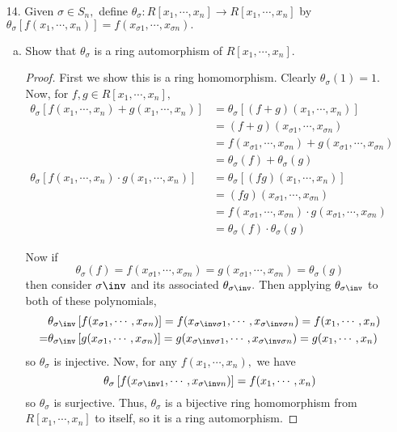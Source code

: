 \documentclass{article}
\begin{document}
\begin{itemize}
	\item[14.] Given $\sigma\in S_n,$ define $\theta_\sigma: R[x_1, \cdots, x_n]\to R[x_1, \cdots, x_n]$ by $\theta_\sigma\left[ f(x_1, \cdots, x_n) \right]=f(x_{\sigma 1}, \cdots, x_{\sigma n}).$
		\begin{enumerate}[(a)]
			\item Show that $\theta_\sigma$ is a ring automorphism of $R[x_1, \cdots, x_n].$
				\begin{proof}
					First we show this is a ring homomorphism. Clearly $\theta_\sigma(1)=1.$ Now, for $f, g\in R[x_1, \cdots, x_n],$
					\begin{align*}
						\theta_\sigma\left[f(x_1, \cdots, x_n)+g(x_1, \cdots, x_n)\right] &= \theta_\sigma\left[ (f+g)(x_1, \cdots, x_n) \right] \\
						&= (f+g)(x_{\sigma1}, \cdots, x_{\sigma n}) \\
						&= f(x_{\sigma1}, \cdots, x_{\sigma n}) + g(x_{\sigma1}, \cdots, x_{\sigma n}) \\
						&= \theta_\sigma(f) + \theta_\sigma(g) \\
						\theta_\sigma\left[f(x_1, \cdots, x_n)\cdot g(x_1, \cdots, x_n)\right] &= \theta_\sigma\left[ (fg)(x_1, \cdots, x_n) \right] \\
						&= (fg)(x_{\sigma1}, \cdots, x_{\sigma n}) \\
						&= f(x_{\sigma1}, \cdots, x_{\sigma n}) \cdot g(x_{\sigma 1}, \cdots, x_{\sigma n}) \\
						&= \theta_\sigma(f)\cdot \theta_\sigma(g)
					\end{align*}

					Now if 
					\[\theta_\sigma(f)=f(x_{\sigma1}, \cdots, x_{\sigma n}) = g(x_{\sigma 1}, \cdots, x_{\sigma n}) = \theta_\sigma(g)\]
					then consider $\sigma\inv$ and its associated $\theta_{\sigma\inv}.$ Then applying $\theta_{\sigma\inv}$ to both of these polynomials, 
					\begin{align*}
						&\theta_{\sigma\inv} \left[ f(x_{\sigma1}, \cdots, x_{\sigma n}) \right] = f(x_{\sigma\inv\sigma1}, \cdots, x_{\sigma\inv\sigma n}) = f(x_1, \cdots, x_n) \\
						=&\theta_{\sigma\inv} \left[ g(x_{\sigma1}, \cdots, x_{\sigma n}) \right] = g(x_{\sigma\inv\sigma 1}, \cdots, x_{\sigma\inv\sigma n}) = g(x_1, \cdots, x_n) 
					\end{align*}
					so $\theta_\sigma$ is injective. Now, for any $f(x_1, \cdots, x_n),$ we have
					\[\theta_\sigma\left[ f(x_{\sigma\inv 1}, \cdots, x_{\sigma\inv n}) \right] = f(x_1, \cdots, x_n)\]
					so $\theta_\sigma$ is surjective. Thus, $\theta_\sigma$ is a bijective ring homomorphism from $R[x_1, \cdots, x_n]$ to itself, so it is a ring automorphism.
				\end{proof}


\end{enumerate}
\end{itemize}
\end{document}
